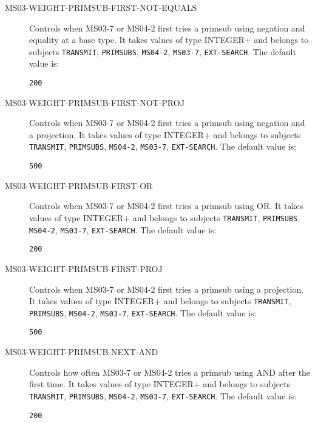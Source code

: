 \begin{description}
\item[MS03-WEIGHT-PRIMSUB-FIRST-NOT-EQUALS]  
Controls when MS03-7 or MS04-2 first tries a primsub using negation and equality
at a base type.
It takes values of type INTEGER+ and belongs to subjects \texttt{TRANSMIT}, \texttt{PRIMSUBS}, \texttt{MS04-2}, \texttt{MS03-7}, \texttt{EXT-SEARCH}.  The default value is: \begin{lstlisting}
200
\end{lstlisting}

\item[MS03-WEIGHT-PRIMSUB-FIRST-NOT-PROJ]  
Controls when MS03-7 or MS04-2 first tries a primsub using negation and a projection.
It takes values of type INTEGER+ and belongs to subjects \texttt{TRANSMIT}, \texttt{PRIMSUBS}, \texttt{MS04-2}, \texttt{MS03-7}, \texttt{EXT-SEARCH}.  The default value is: \begin{lstlisting}
500
\end{lstlisting}

\item[MS03-WEIGHT-PRIMSUB-FIRST-OR]  
Controls when MS03-7 or MS04-2 first tries a primsub using OR.
It takes values of type INTEGER+ and belongs to subjects \texttt{TRANSMIT}, \texttt{PRIMSUBS}, \texttt{MS04-2}, \texttt{MS03-7}, \texttt{EXT-SEARCH}.  The default value is: \begin{lstlisting}
200
\end{lstlisting}

\item[MS03-WEIGHT-PRIMSUB-FIRST-PROJ]  
Controls when MS03-7 or MS04-2 first tries a primsub using a projection.
It takes values of type INTEGER+ and belongs to subjects \texttt{TRANSMIT}, \texttt{PRIMSUBS}, \texttt{MS04-2}, \texttt{MS03-7}, \texttt{EXT-SEARCH}.  The default value is: \begin{lstlisting}
500
\end{lstlisting}

\item[MS03-WEIGHT-PRIMSUB-NEXT-AND]  
Controls how often MS03-7 or MS04-2 tries a primsub using AND after the first time.
It takes values of type INTEGER+ and belongs to subjects \texttt{TRANSMIT}, \texttt{PRIMSUBS}, \texttt{MS04-2}, \texttt{MS03-7}, \texttt{EXT-SEARCH}.  The default value is: \begin{lstlisting}
200
\end{lstlisting}


\end{description}
